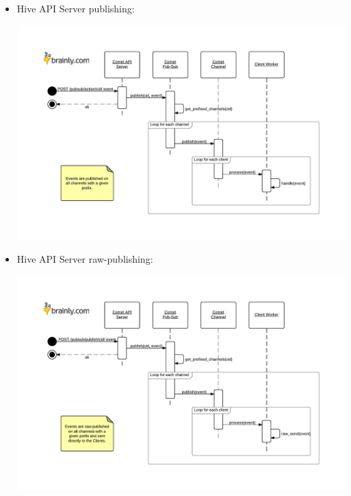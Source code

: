 \documentclass[a4paper]{article}
\begin{document}
\begin{landscape}
\begin{itemize}
\item Hive API Server publishing:
\label{sec-7-3-4-3}%
\begin{center}
\includegraphics[scale=1.0]{./img/pubsub_api_publishing.pdf}
\end{center}

\pagebreak

\item Hive API Server raw-publishing:
\label{sec-7-3-4-4}%
\begin{center}
\includegraphics[scale=1.0]{./img/pubsub_api_raw_publishing.pdf}
\end{center}

\pagebreak


\end{itemize}
\end{landscape}
\end{document}

